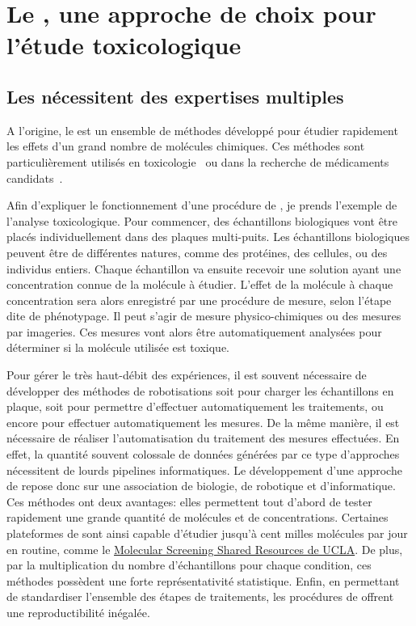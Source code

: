 \documentclass[\main/main.tex]{subfiles}
\begin{document}
            
\section{Le \hcs{}, une approche de choix pour l'étude toxicologique}

    \subsection{Les \hcss{} nécessitent des expertises multiples}
    
%
A l'origine, le \hcs{} est un ensemble de méthodes développé pour étudier rapidement les effets d'un grand nombre de molécules chimiques.
%
Ces méthodes sont particulièrement utilisés en toxicologie~\cite{na_2016} ou dans la recherche de médicaments candidats~\cite{macarron_2011}.

%
Afin d'expliquer le fonctionnement d'une procédure de \hcs{}, je prends l'exemple de l'analyse toxicologique.
%
Pour commencer, des échantillons biologiques vont être placés individuellement dans des plaques multi-puits.
%
Les échantillons biologiques peuvent être de différentes natures, comme des protéines, des cellules, ou des individus entiers.
Chaque échantillon va ensuite recevoir une solution ayant une concentration connue de la molécule à étudier.
%
L'effet de la molécule à chaque concentration sera alors enregistré par une procédure de mesure, selon l'étape dite de phénotypage.
%
Il peut s'agir de mesure physico-chimiques ou des mesures par imageries.
%
Ces mesures vont alors être automatiquement analysées pour déterminer si la molécule utilisée est toxique.

%
Pour gérer le très haut-débit des expériences, il est souvent nécessaire de développer des méthodes de robotisations soit pour charger les échantillons en plaque, soit pour permettre d'effectuer automatiquement les traitements, ou encore pour effectuer automatiquement les mesures.
%
De la même manière, il est nécessaire de réaliser l'automatisation du traitement des mesures effectuées.
%
En effet, la quantité souvent colossale de données générées par ce type d'approches nécessitent de lourds pipelines informatiques.
%
Le développement d'une approche de \hcs{} repose donc sur une association de biologie, de robotique et d'informatique.
%
Ces méthodes ont deux avantages:
%
elles permettent tout d'abord de tester rapidement une grande quantité de molécules et de concentrations.
%
Certaines plateformes de \hcs{} sont ainsi capable d'étudier jusqu'à cent milles molécules par jour en routine,
comme le \href{https://www.mssr.ucla.edu/}{Molecular Screening Shared Resources de UCLA}.
%
De plus, par la multiplication du nombre d'échantillons pour chaque condition, ces méthodes possèdent une forte représentativité statistique.
%
Enfin, en permettant de standardiser l'ensemble des étapes de traitements, les procédures de \hcs{} offrent une reproductibilité inégalée.
\end{document}
